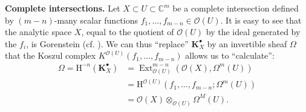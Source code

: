 \documentclass[british]{article}
\newenvironment{rmenv}[1]
  {\phantomsection\par\smallskip\noindent\textbf{#1.}\rmfamily}
  {\par\smallskip}
\begin{document}
\begin{rmenv}{Complete intersections}
Let \(X\subset U\subset\mathbb{C}^m\) be a complete intersection defined
by \((m-n)\)-many scalar functions
\(f_1,\ldots,f_{m-n}\in{\mathscr{O}}(U)\). It is easy to see that the
analytic space \(X\), equal to the quotient of \({\mathscr{O}}(U)\) by
the ideal generated by the \(f_i\), is Gorenstein (cf. \autocite{2}). We
can thus ``replace'' \(\mathbf{K}_X^\bullet\) by an invertible sheaf
\(\Omega\) that the Koszul complex
\(K^{{\mathscr{O}}(U)}(f_1,\ldots,f_{m-n})\) allows us to ``calculate'':
\[
  \begin{aligned}
    \Omega
    = \mathrm{H}^{-n}(\mathbf{K}_X^\bullet)
    &= \operatorname{Ext}_{{\mathscr{O}}(U)}^{m-n}({\mathscr{O}}(X),\Omega^m(U))
  \\&= \mathrm{H}^{{\mathscr{O}}(U)}(f_1,\ldots,f_{m-n};\Omega^m(U))
  \\&= {\mathscr{O}}(X)\otimes_{{\mathscr{O}}(U)}\Omega^M(U).
  \end{aligned}
\]

\end{rmenv}


\nocite{*}
\printbibliography[heading=bibintoc,title=Bibliography]
\end{document}
